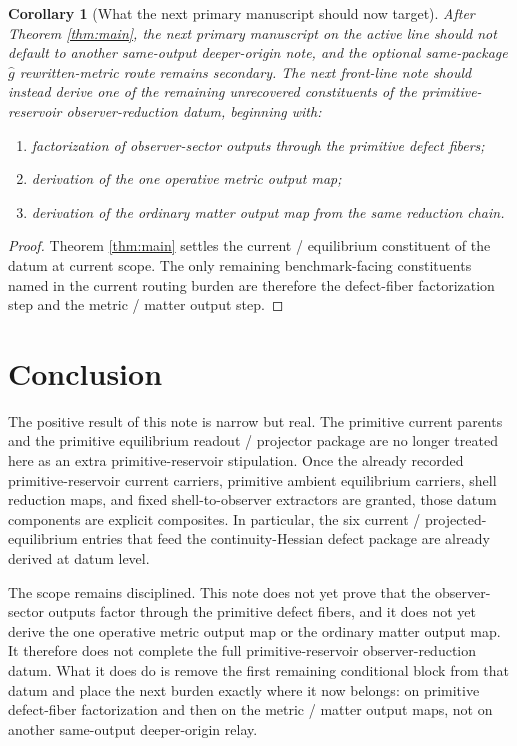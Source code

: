 \documentclass[11pt]{article}
\newtheorem{corollary}{Corollary}
\begin{document}
\begin{corollary}[What the next primary manuscript should now target]
\label{cor:next}
After Theorem \ref{thm:main}, the next primary manuscript on the active line should not default to another same-output deeper-origin note, and the optional same-package \(\widehat g\) rewritten-metric route remains secondary. The next front-line note should instead derive one of the remaining unrecovered constituents of the primitive-reservoir observer-reduction datum, beginning with:
\begin{enumerate}
    \item factorization of observer-sector outputs through the primitive defect fibers;
    \item derivation of the one operative metric output map;
    \item derivation of the ordinary matter output map from the same reduction chain.
\end{enumerate}
\end{corollary}

\begin{proof}
Theorem \ref{thm:main} settles the current / equilibrium constituent of the datum at current scope. The only remaining benchmark-facing constituents named in the current routing burden are therefore the defect-fiber factorization step and the metric / matter output step.
\end{proof}

\section{Conclusion}

The positive result of this note is narrow but real. The primitive current parents and the primitive equilibrium readout / projector package are no longer treated here as an extra primitive-reservoir stipulation. Once the already recorded primitive-reservoir current carriers, primitive ambient equilibrium carriers, shell reduction maps, and fixed shell-to-observer extractors are granted, those datum components are explicit composites. In particular, the six current / projected-equilibrium entries that feed the continuity-Hessian defect package are already derived at datum level.

The scope remains disciplined. This note does not yet prove that the observer-sector outputs factor through the primitive defect fibers, and it does not yet derive the one operative metric output map or the ordinary matter output map. It therefore does not complete the full primitive-reservoir observer-reduction datum. What it does do is remove the first remaining conditional block from that datum and place the next burden exactly where it now belongs: on primitive defect-fiber factorization and then on the metric / matter output maps, not on another same-output deeper-origin relay.
\end{document}
